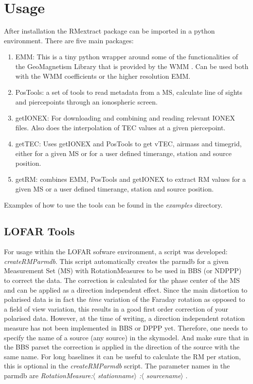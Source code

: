 \documentclass{article}
\begin{document}
\section{Usage}
After installation the RMextract package can be imported in a python
environment. There are five main packages:
\begin{enumerate}
\item EMM: This is a tiny python wrapper around some of the functionalities of
  the GeoMagnetism Library that is provided by the WMM \cite{wmm}. Can be used
  both with the WMM coefficients or the higher resolution EMM.
\item PosTools: a set of tools to read metadata from a MS, calculate line of
  sights and piercepoints through an ionospheric screen.
\item getIONEX: For downloading and combining and reading relevant IONEX
  files. Also does the interpolation of TEC values at a given piercepoint.
\item getTEC: Uses getIONEX and PosTools to get vTEC, airmass and timegrid,
  either for a given MS or for a user defined timerange, station and source
  position.
\item getRM: combines EMM, PosTools and getIONEX to extract RM values for a
  given MS or a user defined timerange, station and source
  position.
\end{enumerate}

Examples of how to use the tools can be found in the \emph{examples} directory.



\subsection{LOFAR Tools}
For usage within the LOFAR sofware environment, a script was
developed: \emph{createRMParmdb}. This script automatically creates  the
parmdb for a given Measurement Set (MS) with RotationMeasures to be used in
BBS (or NDPPP) to correct the data. The correction is calculated for the phase
center of the MS and can be  applied as a direction independent effect. Since
the main distortion to polarised data is in fact the \emph{time} variation of
the Faraday rotation as opposed to a field of view variation, this results in
a good first order correction of your polarised data. However, at the time of
writing, a direction independent rotation measure has not been implemented in
BBS or DPPP yet. Therefore, one needs to specify the name of a source (any
source) in the skymodel. And make sure that in the BBS parset the correction
is applied in the direction of the source with the same name. For long
baselines it can be useful to calculate the RM per station, this is optional
in the \emph{createRMParmdb} script. The parameter names in the parmdb are
\emph{RotationMeasure:$\langle$ stationname$\rangle$ :$\langle$ sourcename$\rangle$ }.
\end{document}
